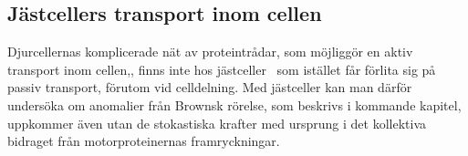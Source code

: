 \subsection{Jästcellers transport inom cellen}

Djurcellernas komplicerade nät av proteintrådar, som möjliggör en aktiv transport inom cellen,, finns inte hos jästceller~\cite{Midtveldt_etal2016} som istället får förlita sig på passiv transport, förutom vid celldelning. 
Med jästceller kan man därför undersöka om anomalier från Brownsk rörelse, som beskrivs i kommande kapitel, uppkommer även utan de stokastiska krafter med ursprung i det kollektiva bidraget från motorproteinernas framryckningar.





